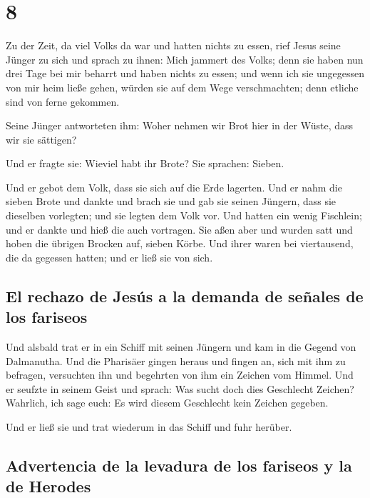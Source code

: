 \hypertarget{section-7}{%
\section{8}\label{section-7}}

 Zu der Zeit, da viel Volks da war und hatten nichts zu
essen, rief Jesus seine Jünger zu sich und sprach zu ihnen:
 Mich jammert des Volks; denn sie haben nun drei Tage bei
mir beharrt und haben nichts zu essen;  und wenn ich sie
ungegessen von mir heim ließe gehen, würden sie auf dem Wege
verschmachten; denn etliche sind von ferne gekommen.

 Seine Jünger antworteten ihm: Woher nehmen wir Brot hier
in der Wüste, dass wir sie sättigen?

 Und er fragte sie: Wieviel habt ihr Brote? Sie sprachen:
Sieben.

 Und er gebot dem Volk, dass sie sich auf die Erde
lagerten. Und er nahm die sieben Brote und dankte und brach sie und gab
sie seinen Jüngern, dass sie dieselben vorlegten; und sie legten dem
Volk vor.  Und hatten ein wenig Fischlein; und er dankte
und hieß die auch vortragen.  Sie aßen aber und wurden
satt und hoben die übrigen Brocken auf, sieben Körbe.  Und
ihrer waren bei viertausend, die da gegessen hatten; und er ließ sie von
sich.

\hypertarget{el-rechazo-de-jesuxfas-a-la-demanda-de-seuxf1ales-de-los-fariseos}{%
\subsection{El rechazo de Jesús a la demanda de señales de los
fariseos}\label{el-rechazo-de-jesuxfas-a-la-demanda-de-seuxf1ales-de-los-fariseos}}

 Und alsbald trat er in ein Schiff mit seinen Jüngern und
kam in die Gegend von Dalmanutha.  Und die Pharisäer
gingen heraus und fingen an, sich mit ihm zu befragen, versuchten ihn
und begehrten von ihm ein Zeichen vom Himmel.  Und er
seufzte in seinem Geist und sprach: Was sucht doch dies Geschlecht
Zeichen? Wahrlich, ich sage euch: Es wird diesem Geschlecht kein Zeichen
gegeben.

 Und er ließ sie und trat wiederum in das Schiff und fuhr
herüber.

\hypertarget{advertencia-de-la-levadura-de-los-fariseos-y-la-de-herodes}{%
\subsection{Advertencia de la levadura de los fariseos y la de
Herodes}\label{advertencia-de-la-levadura-de-los-fariseos-y-la-de-herodes}}

